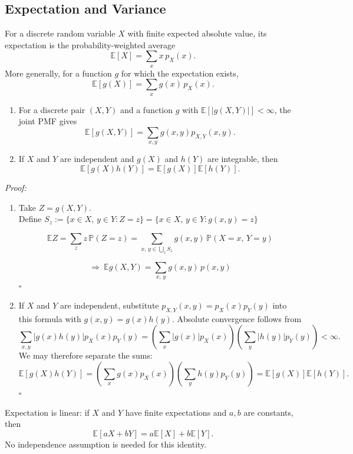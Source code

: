 \documentclass[a4paper,11pt,abstracton]{scrartcl}
\theoremstyle{dotlessP}
\theoremstyle{dotlessS}
\theoremstyle{remark}
\theoremstyle{definition}
\begin{document}
\subsection{Expectation and Variance}

For a discrete random variable $X$ with finite expected absolute value, its expectation is the probability-weighted average
\[
  \mathbb{E}[X]=\sum_x x\,p_X(x).
\]
More generally, for a function $g$ for which the expectation exists,
\[
  \mathbb{E}[g(X)]=\sum_x g(x)\,p_X(x).
\]
\begin{problem_box}
\begin{enumerate}
\item For a discrete pair $(X,Y)$ and a function $g$ with $\mathbb{E}[|g(X,Y)|]<\infty$, the joint PMF gives
\[
  \mathbb{E}[g(X,Y)]
  =\sum_{x,y}g(x,y)p_{X,Y}(x,y).
\]
\item If $X$ and $Y$ are independent and $g(X)$ and $h(Y)$ are integrable, then
\[
  \mathbb{E}[g(X)h(Y)]
  =\mathbb{E}[g(X)]\mathbb{E}[h(Y)].
\]
\end{enumerate}
\end{problem_box}

\begin{claim_box}
\textit{Proof:}
\begin{enumerate}
\item Take $Z = g(X, Y)$.\\
Define $S_z := \{x \in X,\, y \in Y : Z = z\} = \{x \in X,\, y \in Y : g(x, y) = z\}$

\[
\mathbb{E}Z = \sum_{z} z\,\mathbb{P}(Z = z)
= \sum_{x,\, y \in \bigcup_z S_z} g(x, y)\,\mathbb{P}(X = x,\, Y = y)
\]

\[
\Rightarrow\ \mathbb{E}g(X, Y) = \sum_{x,\, y} g(x, y)\,p(x, y)
\]
\hfill$\square$
\item If $X$ and $Y$ are independent, substitute $p_{X,Y}(x,y)=p_X(x)p_Y(y)$ into this formula with $g(x,y)=g(x)h(y)$. Absolute convergence follows from
\[
  \sum_{x,y}|g(x)h(y)|p_X(x)p_Y(y)
  =\left(\sum_x|g(x)|p_X(x)\right)
   \left(\sum_y|h(y)|p_Y(y)\right)<\infty.
\]
We may therefore separate the sums:
\[
  \mathbb{E}[g(X)h(Y)]
  =\left(\sum_xg(x)p_X(x)\right)
   \left(\sum_yh(y)p_Y(y)\right)
  =\mathbb{E}[g(X)]\mathbb{E}[h(Y)].
\]
\hfill$\square$
\end{enumerate}
\end{claim_box}

Expectation is linear: if $X$ and $Y$ have finite expectations and $a,b$ are constants, then
\[
  \mathbb{E}[aX+bY]=a\mathbb{E}[X]+b\mathbb{E}[Y].
\]
No independence assumption is needed for this identity.
\end{document}
